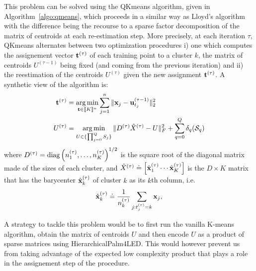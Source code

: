 This problem can be solved using the QKmeans algorithm, given in Algorithm~\ref{algo:qmeans},
which proceeds in a similar way as Lloyd's algorithm with the difference being the 
recourse to a sparse factor decomposition of the matrix of centroids at
each re-estimation step. More precisely, at each iteration $\tau$, 
QKmeans alternates between two 
optimization procedures i) one which computes the assignement vector ${\mathbf{t}}^{(\tau)}$ 
of each training point to a cluster $k$, the matrix of centroids $U^{(\tau-1)}$ being
fixed (and coming from the previous iteration) and ii) the reestimation of the centroids
 $U^{(\tau)}$ given the new assignment ${\mathbf{t}}^{(\tau)}$. A synthetic view of the algorithm
 is:
\begin{subequations}
\label{eq:qmeans}
\begin{align}
{\mathbf{t}}^{(\tau)} &= \operatorname*{arg\,min}_{{\mathbf{t}}\in\llbracket K\rrbracket^n}\sum_{j=1}^n\|{\mathbf{x}}_j-{\mathbf{u}}_{t_j}^{(\tau-1)}\|_{2}^2\label{eq:assignment}\\
U^{(\tau)} &= \operatorname*{arg\,min}_{U\in\{\prod_{j=0}^QS_j\}}\|D^{(\tau)}\hat{X}^{(\tau)}-U\|_F^2+\sum_{q=0}^{Q} \delta_q(\mathcal{S}_q)\label{eq:reestimation}
\end{align}
\end{subequations}
where $D^{(\tau)}=\text{diag}\left({n_1^{(\tau)}},\ldots,{n_K^{(\tau)}}\right)^{1/2}$ is the square
root of the diagonal matrix made of the sizes of each cluster, and $\hat{X}^{(\tau)}\doteq \left[\hat{{\mathbf{x}}}^{(\tau)}_1\cdots\hat{{\mathbf{x}}}^{(\tau)}_K\right]$
is the $D\times K$ matrix that has the barycenter $\hat{{\mathbf{x}}}^{(\tau)}_k$ of cluster $k$ as
its $k$th column, i.e.
\begin{align}
	\hat{{\mathbf{x}}}^{(\tau)}_k \doteq \frac{1}{n_k^{(\tau)}}\sum_{j:t_j^{(\tau)}=k}{\mathbf{x}}_j,
\end{align}





\begin{remark}
A strategy to tackle this problem would be to first run the vanilla K-means algorithm,
 obtain the matrix of centroids $U$ and then encode $U$ as a product of sparse matrices
 using HierarchicalPalm4LED. This would however prevent us from taking advantage of 
 the expected low complexity product that plays a role in the assignement step of 
 the procedure.
\end{remark}

